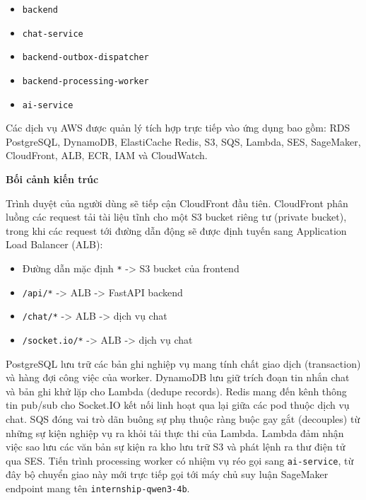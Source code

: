\begin{itemize}
\tightlist
\item
  \texttt{backend}
\item
  \texttt{chat-\allowbreak{}service}
\item
  \texttt{backend-\allowbreak{}outbox-\allowbreak{}dispatcher}
\item
  \texttt{backend-\allowbreak{}processing-\allowbreak{}worker}
\item
  \texttt{ai-\allowbreak{}service}
\end{itemize}

Các dịch vụ AWS được quản lý tích hợp trực tiếp vào ứng dụng bao gồm:
RDS PostgreSQL, DynamoDB, ElastiCache Redis, S3, SQS, Lambda, SES,
SageMaker, CloudFront, ALB, ECR, IAM và CloudWatch.

\vspace{0.5em}\noindent\textbf{Bối cảnh kiến
trúc}\par

Trình duyệt của người dùng sẽ tiếp cận CloudFront đầu tiên. CloudFront
phân luồng các request tải tài liệu tĩnh cho một S3 bucket riêng tư
(private bucket), trong khi các request tới đường dẫn động sẽ được định
tuyến sang Application Load Balancer (ALB):

\begin{itemize}
\tightlist
\item
  Đường dẫn mặc định \texttt{*} -\textgreater{} S3 bucket của frontend
\item
  \texttt{/\allowbreak{}api/\allowbreak{}*} -\textgreater{} ALB -\textgreater{} FastAPI backend
\item
  \texttt{/\allowbreak{}chat/\allowbreak{}*} -\textgreater{} ALB -\textgreater{} dịch vụ chat
\item
  \texttt{/\allowbreak{}socket.\allowbreak{}io/\allowbreak{}*} -\textgreater{} ALB -\textgreater{} dịch vụ chat
\end{itemize}

PostgreSQL lưu trữ các bản ghi nghiệp vụ mang tính chất giao dịch
(transaction) và hàng đợi công việc của worker. DynamoDB lưu giữ trích
đoạn tin nhắn chat và bản ghi khử lặp cho Lambda (dedupe records). Redis
mang đến kênh thông tin pub/sub cho Socket.IO kết nối linh hoạt qua lại
giữa các pod thuộc dịch vụ chat. SQS đóng vai trò dãn buông sự phụ thuộc
ràng buộc gay gắt (decouples) từ những sự kiện nghiệp vụ ra khỏi tải
thực thi của Lambda. Lambda đảm nhận việc sao lưu các văn bản sự kiện ra
kho lưu trữ S3 và phát lệnh ra thư điện tử qua SES. Tiến trình
processing worker có nhiệm vụ réo gọi sang \texttt{ai-\allowbreak{}service}, từ đây
bộ chuyển giao này mới trực tiếp gọi tới máy chủ suy luận SageMaker
endpoint mang tên \texttt{internship-\allowbreak{}qwen3-\allowbreak{}4b}.


